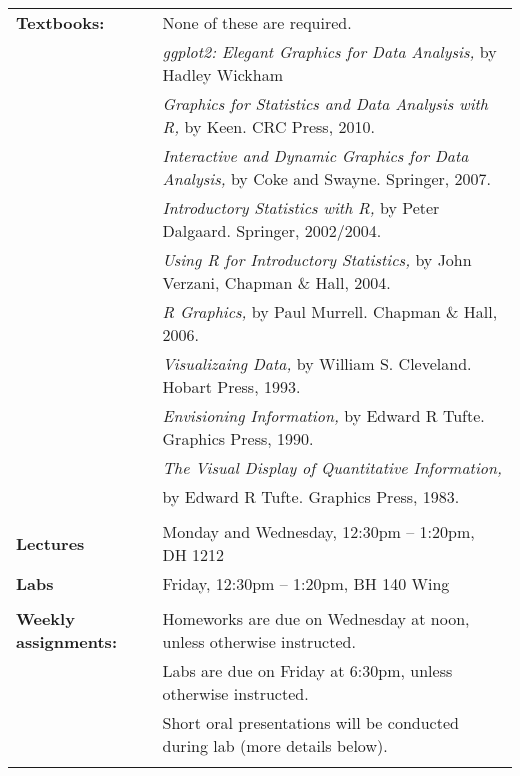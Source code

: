 \documentclass[11pt]{article}
\begin{document}
\begin{tabular}{ll}
{\bf Textbooks:} 
& None of these are required.\\
& {\it ggplot2: Elegant Graphics for Data Analysis,} by Hadley Wickham\\
& {\it Graphics for Statistics and Data Analysis with R,} by Keen.  CRC Press, 2010.\\
& {\it Interactive and Dynamic Graphics for Data Analysis,} by Coke and Swayne.  Springer, 2007.\\
& {\it Introductory Statistics with R,} by Peter Dalgaard.  Springer, 2002/2004.\\
& {\it Using R for Introductory Statistics,} by John Verzani, Chapman \& Hall, 2004.\\
& {\it R Graphics,} by Paul Murrell.  Chapman \& Hall, 2006.\\
& {\it Visualizaing Data,} by William S. Cleveland.  Hobart Press, 1993.\\
& {\it Envisioning Information,} by Edward R Tufte.  Graphics Press, 1990.\\
& {\it The Visual Display of Quantitative Information,} \\ & by Edward R Tufte.  Graphics Press, 1983.\\
& \\




{\bf Lectures}
& Monday and Wednesday, 12:30pm -- 1:20pm, DH 1212\\


{\bf Labs}
& Friday, 12:30pm -- 1:20pm, BH 140 Wing\\

\vspace*{.1in}\\



 {\bf Weekly assignments:}
& Homeworks are due on Wednesday at noon, unless otherwise instructed.\\
& Labs are due on Friday at 6:30pm, unless otherwise instructed.\\
& Short oral presentations will be conducted during lab (more details below).\\

\vspace*{.1in}\\




\end{tabular}
\end{document}
